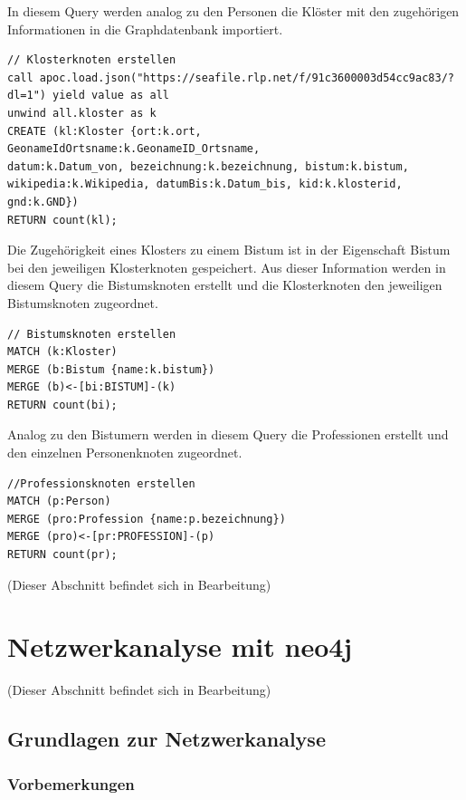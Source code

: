 \documentclass[ngerman,]{scrreprt}
\begin{document}
In diesem Query werden analog zu den Personen die Klöster mit den zugehörigen Informationen in die Graphdatenbank importiert.

\begin{verbatim}
// Klosterknoten erstellen
call apoc.load.json("https://seafile.rlp.net/f/91c3600003d54cc9ac83/?dl=1") yield value as all
unwind all.kloster as k
CREATE (kl:Kloster {ort:k.ort,
GeonameIdOrtsname:k.GeonameID_Ortsname,
datum:k.Datum_von, bezeichnung:k.bezeichnung, bistum:k.bistum, wikipedia:k.Wikipedia, datumBis:k.Datum_bis, kid:k.klosterid, gnd:k.GND})
RETURN count(kl);
\end{verbatim}

Die Zugehörigkeit eines Klosters zu einem Bistum ist in der Eigenschaft Bistum bei den jeweiligen Klosterknoten gespeichert. Aus dieser Information werden in diesem Query die Bistumsknoten erstellt und die Klosterknoten den jeweiligen Bistumsknoten zugeordnet.

\begin{verbatim}
// Bistumsknoten erstellen
MATCH (k:Kloster)
MERGE (b:Bistum {name:k.bistum})
MERGE (b)<-[bi:BISTUM]-(k)
RETURN count(bi);
\end{verbatim}

Analog zu den Bistumern werden in diesem Query die Professionen erstellt und den einzelnen Personenknoten zugeordnet.

\begin{verbatim}
//Professionsknoten erstellen
MATCH (p:Person)
MERGE (pro:Profession {name:p.bezeichnung})
MERGE (pro)<-[pr:PROFESSION]-(p)
RETURN count(pr);
\end{verbatim}

(Dieser Abschnitt befindet sich in Bearbeitung)

\chapter{Netzwerkanalyse mit neo4j}\label{netzwerkanalyse-mit-neo4j}

(Dieser Abschnitt befindet sich in Bearbeitung)

\section{Grundlagen zur Netzwerkanalyse}\label{grundlagen-zur-netzwerkanalyse}

\subsection{Vorbemerkungen}\label{vorbemerkungen}
\end{document}
